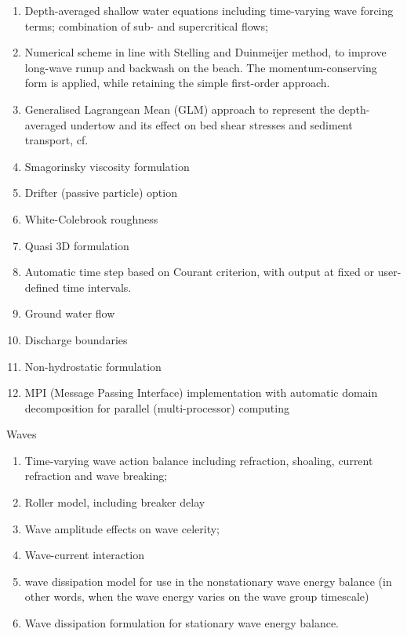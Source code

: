 \begin{enumerate}
  \item  Depth-averaged shallow water equations including time-varying wave forcing terms; combination of sub- and supercritical flows;
  \item  Numerical scheme in line with Stelling and Duinmeijer method, to improve long-wave runup and backwash on the beach. The momentum-conserving form is applied, while retaining the simple first-order approach. 
  \item  Generalised Lagrangean Mean (GLM) approach to represent the depth-averaged undertow and its effect on bed shear stresses and sediment transport, cf. \citet{Reniers2004}
  \item  Smagorinsky viscosity formulation
  \item  Drifter (passive particle) option
  \item  White-Colebrook roughness
  \item  Quasi 3D formulation
  \item  Automatic time step based on Courant criterion, with output at fixed or user-defined time intervals.
  \item  Ground water flow
  \item  Discharge boundaries
  \item  Non-hydrostatic formulation
  \item  MPI (Message Passing Interface) implementation with automatic domain decomposition for parallel (multi-processor) computing
\end{enumerate}

Waves

\begin{enumerate}
  \item  Time-varying wave action balance including refraction, shoaling, current refraction and wave breaking; 
  \item  Roller model, including breaker delay
  \item  Wave amplitude effects on wave celerity;
  \item  Wave-current interaction
  \item  \citet{Roelvink1993a} wave dissipation model for use in the nonstationary wave energy balance (in other words, when the wave energy varies on the wave group timescale)
  \item  \citet{Baldock1998} Wave dissipation formulation for stationary wave energy balance.
\end{enumerate}


